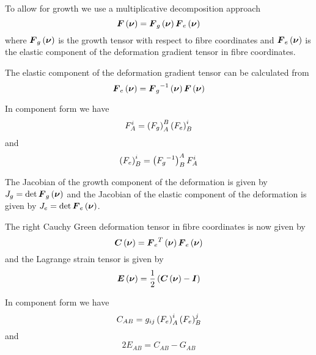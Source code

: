 To allow for growth we use a multiplicative decomposition approach \ie
\begin{equation}
   \boldsymbol{F}\left( \boldsymbol{\nu} \right) = \boldsymbol{F}_{g}\left( \boldsymbol{\nu} \right)  \boldsymbol{F}_{e}\left( \boldsymbol{\nu} \right) 
\end{equation}
where $ \boldsymbol{F}_{g}\left( \boldsymbol{\nu} \right) $ is the growth tensor with
respect to fibre coordinates and $ \boldsymbol{F}_{e}\left( \boldsymbol{\nu} \right) $ is the
elastic component of the deformation gradient tensor in fibre coordinates.

The elastic component of the deformation gradient tensor can be calculated
from
\begin{equation}
   \boldsymbol{F}_{e}\left( \boldsymbol{\nu} \right) = {\boldsymbol{F}_{g}}^{-1}\left( \boldsymbol{\nu} \right)  \boldsymbol{F}\left( \boldsymbol{\nu} \right) 
\end{equation}

In component form we have
\begin{equation}
  F^{i}_{A}=\left( F_{g} \right)^{B}_{A}\left( F_{e} \right)^{i}_{B}
\end{equation}
and
\begin{equation}
  \left( F_{e} \right)^{i}_{B}=\left( {F_{g}}^{-1} \right)^{A}_{B}F^{i}_{A}
\end{equation}

The Jacobian of the growth component of the deformation is given by
$J_{g}=\det{\ensuremath{ \boldsymbol{F}_{g}\left( \boldsymbol{\nu} \right) }}$ and the Jacobian of the
elastic component of the deformation is given by
$J_{e}=\det{\ensuremath{ \boldsymbol{F}_{e}\left( \boldsymbol{\nu} \right) }}$.

The right Cauchy Green deformation tensor in fibre coordinates is now given by
\begin{equation}
   \boldsymbol{C}\left( \boldsymbol{\nu} \right) = {\boldsymbol{F}_{e}}^{T}\left( \boldsymbol{\nu} \right)  \boldsymbol{F}_{e}\left( \boldsymbol{\nu} \right) 
\end{equation}
and the Lagrange strain tensor is given by
\begin{equation}
   \boldsymbol{E}\left( \boldsymbol{\nu} \right) =\frac{1}{2}\left(  \boldsymbol{C}\left( \boldsymbol{\nu} \right) -\boldsymbol{I} \right)
\end{equation}

In component form we have
\begin{equation}
  C_{AB}=g_{ij}\left( F_{e} \right)^{i}_{A}\left( F_{e} \right)^{j}_{B}
\end{equation}
and
\begin{equation}
  2E_{AB}=C_{AB}-G_{AB}
\end{equation}

